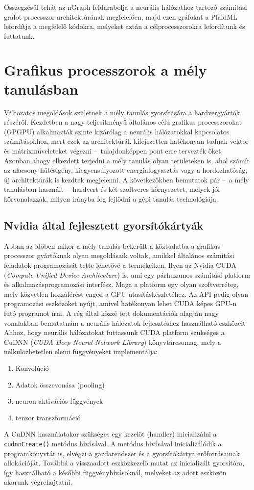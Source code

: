 Összegzésül tehát az nGraph feldarabolja a neurális hálózathoz tartozó számítási gráfot processzor architektúrának megfelelően, majd ezen gráfokat a PlaidML lefordítja a megfelelő kódokra, melyeket aztán a célprocesszorokra lefordítunk és futtatunk.

\section{Grafikus processzorok a mély tanulásban}
Változatos megoldások születnek a mély tanulás gyorsítására a hardvergyártók részéről. Kezdetben a nagy teljesítményű általános célú grafikus processzorokat (GPGPU) alkalmazták szinte kizárólag a neurális hálózatokkal kapcsolatos számításokhoz, mert ezek az architektúrák kifejezetten hatékonyan tudnak vektor és mátrixműveleteket végezni --~tulajdonképpen pont erre tervezték őket. Azonban ahogy elkezdett terjedni a mély tanulás olyan területeken is, ahol számít az alacsony hűtésigény, kiegyensúlyozott energiafogyasztás vagy a hordozhatóság, új architektúrák is kezdtek megjelenni. A következőkben bemutatok pár --~a mély tanulásban használt~-- hardvert és két szoftveres környezetet, melyek jól körvonalazzák, milyen irányba fog fejlődni a gépi tanulás technológiája.

\subsection{Nvidia által fejlesztett gyorsítókártyák}
Abban az időben mikor a mély tanulás bekerült a köztudatba a grafikus processzor gyártóknak olyan megoldásaik voltak, amikkel általános számítási feladatok programozását tette lehetővé a termékeiken. Ilyen az Nvidia CUDA (\emph{Compute Unified Device Architecture}) is, ami egy párhuzamos számítási platform és alkalmazásprogramozási interfész. Maga a platform egy olyan szoftverréteg, mely közvetlen hozzáférést enged a GPU utasításkészletéhez.\cite{wiki:cuda} Az API pedig olyan programozási eszközöket nyújt, amivel hatékonyan lehet CUDA képes GPU-n futó programot írni. A cég által közzé tett dokumentációk alapján nagy vonalakban bemutatnám a neurális hálózatok fejlesztéshez használható eszközeit\cite{web:cudnn}
Ahhoz, hogy neurális hálózatokat futtassunk CUDA platform szükséges a CuDNN (\emph{CUDA Deep Neural Network Library}) könyvtárcsomag, mely a nélkülözhetetlen elemi függvényeket implementálja:
\begin{enumerate}
	\item Konvolúció
	\item Adatok összevonása (pooling)
	\item neuron aktivációs függvények
	\item tenzor transzformáció
\end{enumerate}
A CuDNN használatakor szükséges egy kezelőt (handler) inicializálni a \verb|cudnnCreate()| metódus hívásával. A metódus hívásával inicializálódik a programkönyvtár is, elvégzi a gazdarendszer és a gyorsítókártya erőforrásainak allokációját. Továbbá a visszaadott eszközkezelő mutat az inicializált gyorsítóra, így használható a későbbi függvényhívásoknál, melyeket az adott eszközön akarunk végrehajtatni.

